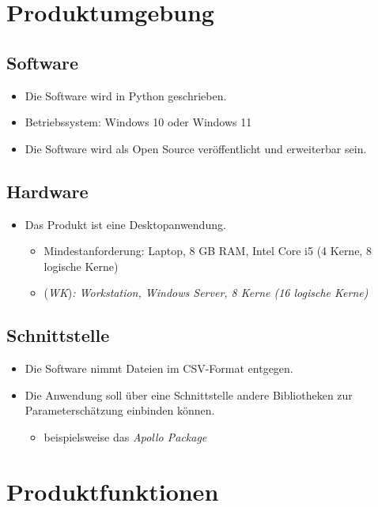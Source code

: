 \documentclass{article}
\begin{document}
\clearpage
\section{Produktumgebung}
\subsection{Software}
\begin{itemize}
    \item Die Software wird in Python geschrieben.
    \item Betriebssystem: Windows 10 oder Windows 11
    \item Die Software wird als Open Source veröffentlicht und erweiterbar sein.
\end{itemize}
\subsection{Hardware}
\begin{itemize}
    \item Das Produkt ist eine Desktopanwendung.
    \begin{itemize}
        \item Mindestanforderung: Laptop, 8 GB RAM, Intel Core i5 (4 Kerne, 8 logische Kerne)
        \item (\textit{WK})\textit{: Workstation, Windows Server, 8 Kerne (16 logische Kerne)}
    \end{itemize}
\end{itemize}
\subsection{Schnittstelle}
\begin{itemize}
    \item Die Software nimmt Dateien im CSV-Format entgegen.
    \item Die Anwendung soll über eine Schnittstelle andere Bibliotheken zur Parameterschätzung einbinden können.
    \begin{itemize}
        \item beispielsweise das \textit{Apollo Package}
    \end{itemize}
\end{itemize}

\clearpage
\section{Produktfunktionen}
\end{document}
